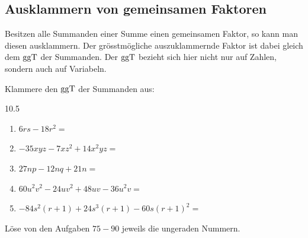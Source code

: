 \documentclass[11pt,oneside]{article}
\begin{document}
\subsection{Ausklammern von gemeinsamen Faktoren}
    Besitzen alle Summanden einer Summe einen gemeinsamen Faktor, so kann man diesen ausklammern. Der grösstmögliche auszuklammernde Faktor ist dabei gleich dem $\operatorname{ggT}$ der Summanden. Der $\operatorname{ggT}$ bezieht sich hier nicht nur auf Zahlen, sondern auch auf Variabeln.
    \begin{beispiel}
        Klammere den $\operatorname{ggT}$ der Summanden aus:
        \begin{gridspace}{10.5}
        	\begin{enumerate}[label=\alph*)]
        		\item $6rs-18r^{2}=$\\
        		\item $-35xyz-7xz^{2}+14x^{2}yz=$\\
        		\item $27np-12nq+21n=$\\
        		\item $60u^{2}v^{2}-24uv^{2}+48uv-36u^{2}v=$\\
        		\item $-84s^{2}(r+1)+24s^{3}(r+1)-60s(r+1)^{2}=$\\
        	\end{enumerate}
        \end{gridspace}
    \end{beispiel}
    \begin{aufgabe}
        Löse von den Aufgaben $75-90$ jeweils die ungeraden Nummern.
    \end{aufgabe}
\end{document}
